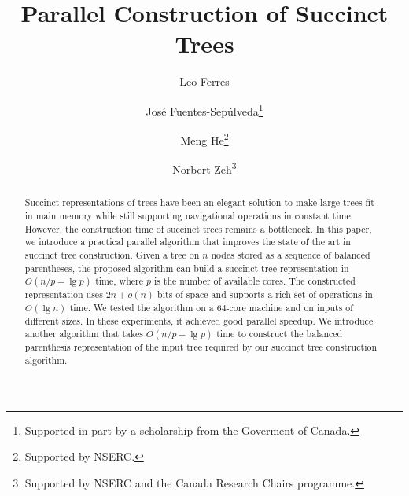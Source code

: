 \documentclass[runningheads]{llncs}
\begin{document}
\title{Parallel Construction of Succinct Trees}

\author{Leo Ferres
  \and
  Jos\'e Fuentes-Sep\'ulveda\fnmsep\thanks{Supported
    in part by a scholarship from the Goverment of Canada.}
  \and
  Meng He\fnmsep\thanks{Supported by NSERC.}
  \and
  Norbert Zeh\fnmsep\thanks{Supported by NSERC and the Canada Research
    Chairs programme.}}




\maketitle
\vspace{-20pt}
\begin{abstract}
  Succinct representations of trees have been an elegant solution to
  make large trees fit in main memory while still supporting
  navigational operations in constant time.  However, the construction
  time of succinct trees remains a bottleneck.  In this paper, we
  introduce a practical parallel algorithm that improves the state of
  the art in succinct tree construction.  Given a tree on $n$ nodes
  stored as a sequence of balanced parentheses, the proposed algorithm
  can build a succinct tree representation in $O(n/p+\lg p)$ time,
  where $p$ is the number of available cores.  The constructed
  representation uses $2n + o(n)$ bits of space and supports a rich
  set of operations in $O(\lg n)$ time.  We tested the algorithm on a
  $64$-core machine and on inputs of different sizes.  In these
  experiments, it achieved good parallel speedup.  We introduce
  another algorithm that takes $O(n/p + \lg p)$ time to construct the
  balanced parenthesis representation of the input tree required by
  our succinct tree construction algorithm.
\end{abstract}
%

\end{document}
